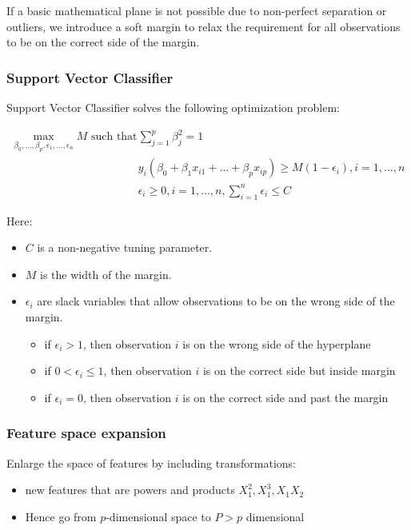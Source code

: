 If a basic mathematical plane is not possible due to non-perfect separation or outliers, we introduce a soft margin to relax the requirement for all observations to be on the correct side of the margin.

\subsubsection{Support Vector Classifier}

\indent 

Support Vector Classifier solves the following optimization problem:

\begin{align*}
    \max_{\beta_0,...,\beta_p,\epsilon_1,...,\epsilon_n}M \text{ such that } & \sum_{j=1}^p \beta_j^2 = 1\\
    & y_i(\beta_0+\beta_1x_{i1}+...+\beta_px_{ip})\geq M(1-\epsilon_i), i =1,...,n\\
    & \epsilon_i \geq0, i = 1,...,n, \sum_{i=1}^n\epsilon_i\leq C
\end{align*}

Here:

\begin{itemize}
    \item $C$ is a non-negative tuning parameter.
    \item $M$ is the width of the margin.
    \item $\epsilon_i$ are slack variables that allow observations to be on the wrong side of the margin.
    \begin{itemize}
        \item if $\epsilon_i>1$, then observation $i$ is on the wrong side of the hyperplane
        \item if $0<\epsilon_i\leq 1$, then observation $i$ is on the correct side but inside margin
        \item if $\epsilon_i = 0$, then observation $i$ is on the correct side and past the margin
    \end{itemize}
\end{itemize}

\subsubsection{Feature space expansion}

\indent 

Enlarge the space of features by including transformations:

\begin{itemize}
    \item new features that are powers and products $X_1^2,X_1^3,X_1X_2$
    \item Hence go from $p$-dimensional space to $P>p$ dimensional
\end{itemize}

